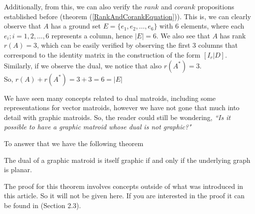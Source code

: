 \begin{exmp}
Additionally, from this, we can also verify the $rank$ and $corank$ propositions established before (theorem (\ref{RankAndCorankEquation})). This is, we can clearly observe that $A$ has a ground set $E=\{e_1, e_2, \dots, e_6\}$ with 6 elements, where each $e_i; i =1,2, \dots,6$ represents a column, hence $|E|=6$. We also see that $A$ has rank $r(A)=3$, which can be easily verified by observing the first 3 columns that correspond to the identity matrix in the construction of the form $[I_r|D]$. Similarly, if we observe the dual, we notice that also $r(A^*)=3$. \\So, $r(A)+r(A^*)= 3 + 3 = 6 = |E|$
\end{exmp}

%

We have seen many concepts related to dual matroids, including some representations for vector matroids, however we have not gone that much into detail with graphic matroids. So, the reader could still be wondering, \textit{``Is it possible to have a graphic matroid whose dual is not graphic?"}

To answer that we have the following theorem

\begin{theorem}
    The dual of a graphic matroid is itself graphic if and only if the underlying graph is planar.
\end{theorem}
The proof for this theorem involves concepts outside of what was introduced in this article. So it will not be given here. If you are interested in the proof it can be found in \cite{oxley1} (Section 2.3).


